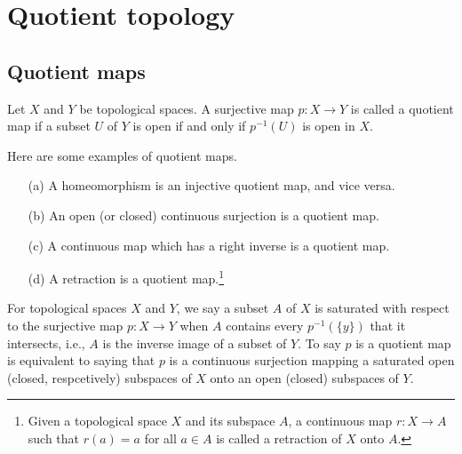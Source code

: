 \section{Quotient topology}

\subsection{Quotient maps}

\begin{defi}
    Let $X$ and $Y$ be topological spaces.
    A surjective map $p: X\rightarrow Y$ is called a quotient map if a subset $U$ of $Y$ is open if and only if $p^{-1}(U)$ is open in $X$.
\end{defi}
\begin{exmp}
    Here are some examples of quotient maps.
    \begin{enumerate}
        \item[(a)]
        {
            A homeomorphism is an injective quotient map, and vice versa.
        }
        \item[(b)]
        {
            An open (or closed) continuous surjection is a quotient map.
        }
        \item[(c)]
        {
            A continuous map which has a right inverse is a quotient map.
        }
        \item[(d)]
        {
            A retraction is a quotient map.\footnote{Given a topological space $X$ and its subspace $A$, a continuous map $r: X\rightarrow A$ such that $r(a)=a$ for all $a\in A$ is called a retraction of $X$ onto $A$.}
        }
    \end{enumerate}
\end{exmp}

For topological spaces $X$ and $Y$, we say a subset $A$ of $X$ is saturated with respect to the surjective map $p: X\rightarrow Y$ when $A$ contains every $p^{-1}(\{y\})$ that it intersects, i.e., $A$ is the inverse image of a subset of $Y$.
To say $p$ is a quotient map is equivalent to saying that $p$ is a continuous surjection mapping a saturated open (closed, respcetively) subspaces of $X$ onto an open (closed) subspaces of $Y$.

